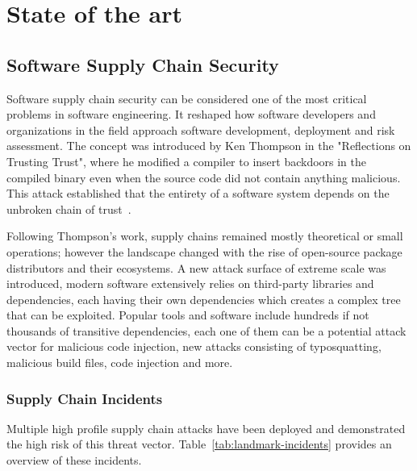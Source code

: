 
\chapter{State of the art}\label{chapter:chap2}

\section{Software Supply Chain Security}\label{sect:supply-chain-security}

Software supply chain security can be considered one of the most critical problems in software engineering. It reshaped how software developers and organizations in the field approach software development, deployment and risk assessment. The concept was introduced by Ken Thompson in the "Reflections on Trusting Trust", where he modified a compiler to insert backdoors in the compiled binary even when the source code did not contain anything malicious. This attack established that the entirety of a software system depends on the unbroken chain of trust~\cite{thompson1984trust}.

Following Thompson's work, supply chains remained mostly theoretical or small operations; however the landscape changed with the rise of open-source package distributors and their ecosystems. A new attack surface of extreme scale was introduced, modern software extensively relies on third-party libraries and dependencies, each having their own dependencies which creates a complex tree that can be exploited. Popular tools and software include hundreds if not thousands of transitive dependencies, each one of them can be a potential attack vector for malicious code injection, new attacks consisting of typosquatting, malicious build files, code injection and more.

\subsection{Supply Chain Incidents}\label{sect:supply-chain-incidents}
Multiple high profile supply chain attacks have been deployed and demonstrated the high risk of this threat vector. Table~\ref{tab:landmark-incidents} provides an overview of these incidents.

